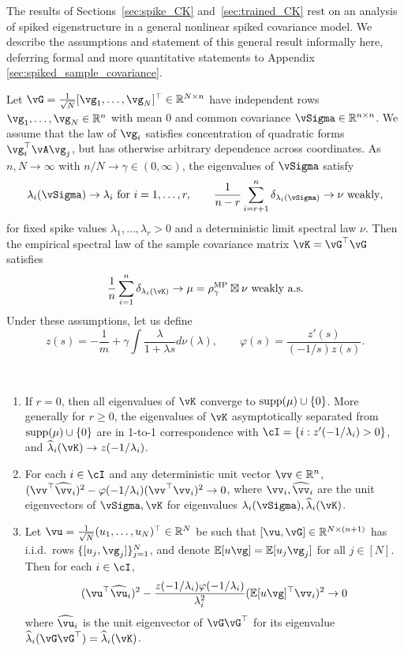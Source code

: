 The results of Sections~\ref{sec:spike_CK} and~\ref{sec:trained_CK} rest on an
analysis of spiked eigenstructure in a general nonlinear spiked covariance
model. We describe the assumptions and statement of this general result
informally here, deferring formal and more quantitative statements
to Appendix \ref{sec:spiked_sample_covariance}.

Let
$\vG=\frac{1}{\sqrt{N}}[\vg_1,\ldots,\vg_N]^\top\in\R^{N\times n}$
have independent rows $\vg_1,\ldots,\vg_N \in \R^n$ with mean 0 and common
covariance $\vSigma \in \R^{n \times n}$. We assume that the law of $\vg_i$
satisfies concentration of quadratic forms $\vg_i^\top \vA\vg_j$, but has
otherwise arbitrary dependence across coordinates.
As $n,N \to \infty$ with $n/N \to \gamma \in (0,\infty)$,
the eigenvalues of $\vSigma$ satisfy
\[\lambda_i(\vSigma) \to \lambda_i \text{ for } i=1,\ldots,r, \qquad
\frac{1}{n-r}\sum_{i=r+1}^n \delta_{\lambda_i(\vSigma)} \to \nu \text{ weakly},\]
for fixed spike values $\lambda_1,\ldots,\lambda_r>0$ and a deterministic
limit spectral law $\nu$. Then the empirical spectral law of the sample
covariance matrix $\vK=\vG^\top \vG$ satisfies
\[\frac{1}{n}\sum_{i=1}^n \delta_{\lambda_i(\vK)} \to \mu=\rho_\gamma^{\MP}
\boxtimes \nu \text{ weakly a.s.}\]
Under these assumptions, let us define
\[z(s)={-}\frac{1}{m}+\gamma\int \frac{\lambda}{1+\lambda s}d\nu(\lambda),
\qquad \varphi(s)=\frac{z'(s)}{(-1/s)z(s)}.\]
\vspace{-\baselineskip}

\begin{theorem}[informal]\label{thm:informal}~
\begin{enumerate}[label=(\alph*)]
\item If $r=0$, then all eigenvalues of $\vK$ converge to
$\mathrm{supp}({\mu}) \cup \{0\}$. More generally for $r \geq 0$, the eigenvalues of
$\vK$ asymptotically
separated from $\mathrm{supp}({\mu}) \cup \{0\}$ are in 1-to-1 correspondence with
$\cI=\{i:z'(-1/\lambda_i)>0\}$, and
$\widehat{\lambda}_i(\vK) \to z(-1/\lambda_i)$.
\item For each $i \in \cI$ and any deterministic unit vector $\vv \in \R^n$,
$(\vv^\top \widehat \vv_i)^2-\varphi(-1/\lambda_i)(\vv^\top \vv_i)^2 \to 0$,
where $\vv_i,\widehat\vv_i$ are the unit eigenvectors of $\vSigma,\vK$ for
eigenvalues $\lambda_i(\vSigma),\widehat \lambda_i(\vK)$.
\item Let $\vu=\frac{1}{\sqrt{N}}(u_1,\ldots,u_N)^\top \in \R^N$ be such that
$[\vu,\vG] \in \R^{N \times (n+1)}$ has i.i.d.\ rows $\{[u_j,\vg_j]\}_{j=1}^N$, and denote
$\E[u\vg]=\E[u_j\vg_j]$ for all $j \in [N]$. Then for each $i \in \cI$,
\[(\vu^\top \widehat{\vu}_i)^2-\frac{z(-1/\lambda_i)\varphi(-1/\lambda_i)}{\lambda_i^2}
(\E[u\vg]^\top \vv_i)^2 \to 0\]
where $\widehat{\vu}_i$ is the unit eigenvector of
$\vG\vG^\top$ for its eigenvalue
$\widehat\lambda_i(\vG\vG^\top)=\widehat\lambda_i(\vK)$.
\end{enumerate}
\end{theorem}

